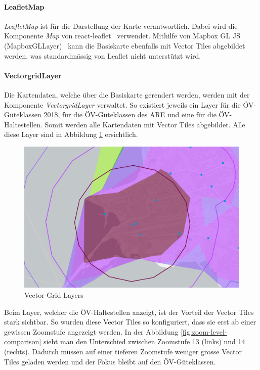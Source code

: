 \paragraph{LeafletMap}
\emph{LeafletMap} ist für die Darstellung der Karte verantwortlich.
Dabei wird die Komponente \emph{Map} von react-leaflet~\cite{react-leaflet} verwendet.
Mithilfe von Mapbox GL JS (MapboxGLLayer)~\cite{mapbox_gl_leaflet} kann die Basiskarte ebenfalls mit Vector Tiles abgebildet werden, was standardmässig von Leaflet nicht unterstützt wird.

\paragraph{VectorgridLayer}
Die Kartendaten, welche über die Basiskarte gerendert werden, werden mit der Komponente \emph{VectorgridLayer} verwaltet.
So existiert jeweils ein Layer für die \acs{ÖV}-Güteklassen 2018, für die \acs{ÖV}-Güteklassen des \acl{ARE} und eine für die ÖV-Haltestellen.
Somit werden alle Kartendaten mit Vector Tiles abgebildet.
Alle diese Layer sind in Abbildung \ref{fig:Vector-Grid-Layers} ersichtlich.

\begin{figure}[ht]
    \centering
    \includegraphics[width=0.6\linewidth]{projectdoc/img/vectorgrid_layers.png}
    \caption[Vector-Grid Layers]{Vector-Grid Layers}
    \label{fig:Vector-Grid-Layers}
\end{figure}

Beim Layer, welcher die ÖV-Haltestellen anzeigt, ist der Vorteil der Vector Tiles stark sichtbar.
So wurden diese Vector Tiles so konfiguriert, dass sie erst ab einer gewissen Zoomstufe angezeigt werden. In der Abbildung \ref{fig:zoom-level-comparison} sieht man den Unterschied zwischen Zoomstufe 13 (links) und 14 (rechts).
Dadurch müssen auf einer tieferen Zoomstufe weniger grosse Vector Tiles geladen werden und der Fokus bleibt auf den \acs{ÖV}-Güteklassen.

